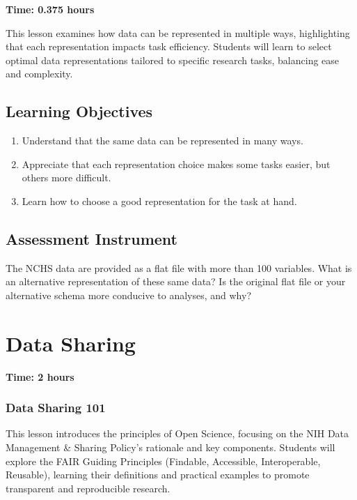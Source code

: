 \textbf{Time: 0.375 hours}

This lesson examines how data can be represented in multiple ways, highlighting that each representation impacts task efficiency. Students will learn to select optimal data representations tailored to specific research tasks, balancing ease and complexity.

\subsection{Learning Objectives}

\begin{enumerate}
    \item Understand that the same data can be represented in many ways.
    \item Appreciate that each representation choice makes some tasks easier, but others more difficult.
    \item Learn how to choose a good representation for the task at hand.
\end{enumerate}

\subsection{Assessment Instrument}

The NCHS data are provided as a flat file with more than 100 variables. What is an alternative representation of these same data? Is the original flat file or your alternative schema more conducive to analyses, and why?

\section{Data Sharing}
\label{sec:2.4}

\textbf{Time: 2 hours}

\subsubsection{Data Sharing 101}

This lesson introduces the principles of Open Science, focusing on the NIH Data Management \& Sharing Policy's rationale and key components. Students will explore the FAIR Guiding Principles (Findable, Accessible, Interoperable, Reusable), learning their definitions and practical examples to promote transparent and reproducible research.

